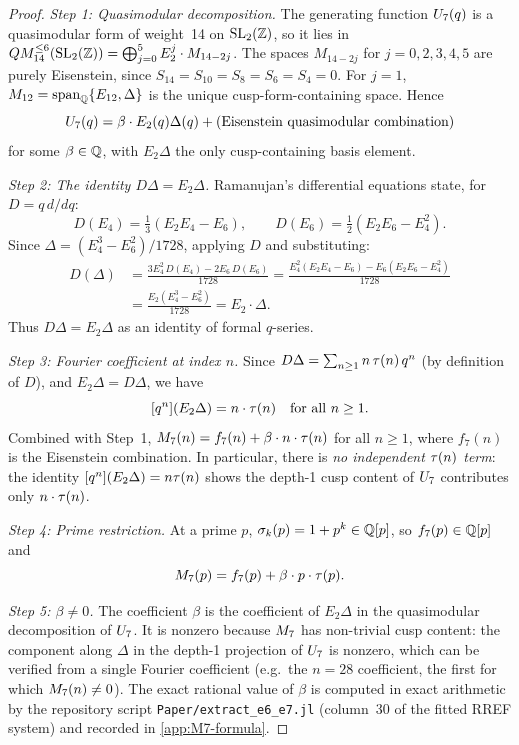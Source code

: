 \documentclass[11pt]{article}
\begin{document}
\begin{proof}
\textit{Step 1: Quasimodular decomposition.}
The generating function $U_{7}(q)$ is a quasimodular form of weight~14 on $\operatorname{SL}_2(\mathbb{Z})$,
so it lies in $QM_{14}^{\le 6}(\operatorname{SL}_2(\mathbb{Z})) = \bigoplus_{j=0}^{5} E_2^j\cdot M_{14-2j}$.
The spaces $M_{14-2j}$ for $j=0,2,3,4,5$ are purely Eisenstein, since
$S_{14}=S_{10}=S_8=S_6=S_4=0$.
For $j=1$, $M_{12}=\operatorname{span}_{\mathbb{Q}}\{E_{12},\Delta\}$ is the unique cusp-form-containing space.
Hence
\[
  U_{7}(q) = \beta\cdot E_2(q)\Delta(q) + (\text{Eisenstein quasimodular combination})
\]
for some $\beta\in\mathbb{Q}$, with $E_2\Delta$ the only cusp-containing basis element.

\textit{Step 2: The identity $D\Delta = E_2\Delta$.}
Ramanujan's differential equations \cite{KZ1995} state, for $D = q\,d/dq$:
\[
  D(E_4) = \tfrac{1}{3}(E_2 E_4 - E_6),\qquad
  D(E_6) = \tfrac{1}{2}(E_2 E_6 - E_4^2).
\]
Since $\Delta = (E_4^3 - E_6^2)/1728$, applying $D$ and substituting:
\begin{align*}
  D(\Delta)
  &= \frac{3E_4^2\,D(E_4) - 2E_6\,D(E_6)}{1728}
   = \frac{E_4^2(E_2 E_4-E_6) - E_6(E_2 E_6-E_4^2)}{1728}\\
  &= \frac{E_2(E_4^3-E_6^2)}{1728} = E_2\cdot\Delta.
\end{align*}
Thus $D\Delta = E_2\Delta$ as an identity of formal $q$-series.

\textit{Step 3: Fourier coefficient at index $n$.}
Since $D\Delta = \sum_{n\ge 1} n\,\tau(n)\,q^n$ (by definition of $D$), and
$E_2\Delta = D\Delta$, we have
\[
  [q^n](E_2\Delta) = n\cdot\tau(n)\quad\text{for all }n\ge 1.
\]
Combined with Step~1, $M_{7}(n) = f_7(n) + \beta\cdot n\cdot\tau(n)$ for all $n\ge 1$,
where $f_7(n)$ is the Eisenstein combination.
In particular, there is \emph{no independent $\tau(n)$ term}: the identity
$[q^n](E_2\Delta)=n\tau(n)$ shows the depth-1 cusp content of $U_{7}$ contributes
only $n\cdot\tau(n)$.

\textit{Step 4: Prime restriction.}
At a prime $p$, $\sigma_{k}(p)=1+p^k\in\mathbb{Q}[p]$, so $f_7(p)\in\mathbb{Q}[p]$ and
\[
  M_{7}(p) = f_7(p) + \beta\cdot p\cdot\tau(p).
\]

\textit{Step 5: $\beta\ne 0$.}
The coefficient $\beta$ is the coefficient of $E_2\Delta$ in the quasimodular decomposition
of $U_{7}$.
It is nonzero because $M_{7}$ has non-trivial cusp content: the component along $\Delta$
in the depth-1 projection of $U_{7}$ is nonzero, which can be verified from a single
Fourier coefficient (e.g.\ the $n=28$ coefficient, the first for which $M_{7}(n)\ne 0$).
The exact rational value of $\beta$ is computed in exact arithmetic by the repository
script \texttt{Paper/extract\_e6\_e7.jl} (column~30 of the fitted RREF system) and
recorded in \cref{app:M7-formula}.
\end{proof}
\end{document}
